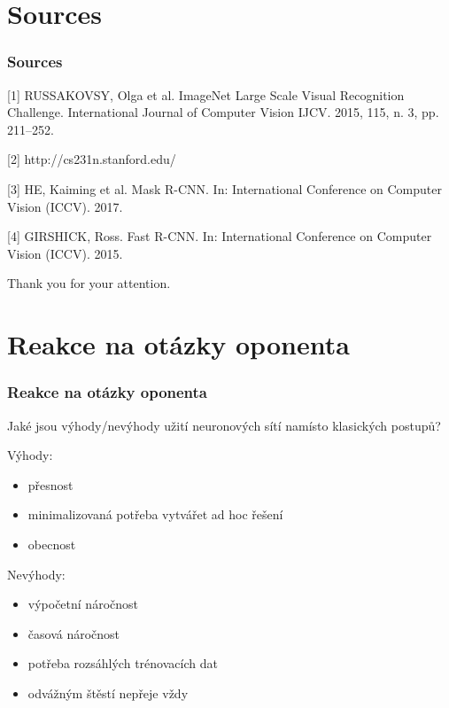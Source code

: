 \documentclass{beamer}
\begin{document}

\section{Sources}

\begin{frame}

\frametitle{Sources}

[1] RUSSAKOVSY, Olga et al.
ImageNet Large Scale Visual Recognition
Challenge. International Journal of Computer Vision IJCV. 2015, 115, n. 3,
pp. 211–252.

[2] http://cs231n.stanford.edu/

[3] HE, Kaiming et al. Mask R-CNN. In: International Conference on Computer
Vision (ICCV). 2017.

[4] GIRSHICK, Ross. Fast R-CNN. In: International Conference on Computer
Vision (ICCV). 2015.

\end{frame}


\begin{frame}

\centerline{Thank you for your attention.}

\end{frame}

\iffalse
\section{Reakce na otázky oponenta}

\begin{frame}

\frametitle{Reakce na otázky oponenta}

Jaké jsou výhody/nevýhody užití neuronových sítí namísto klasických postupů?

\begin{center}
	\noindent\makebox[\linewidth]{\rule{0.9\textwidth}{0.4pt}}
\end{center}

\bigskip

Výhody:
\begin{itemize}
	\item<2-> přesnost
	\item<3-> minimalizovaná potřeba vytvářet ad hoc řešení
	\item<4-> obecnost
\end{itemize}

Nevýhody:
\begin{itemize}
	\item<5-> výpočetní náročnost
	\item<6-> časová náročnost
	\item<7-> potřeba rozsáhlých trénovacích dat
	\item<8-> odvážným štěstí nepřeje vždy
\end{itemize}

\end{frame}
\end{document}
